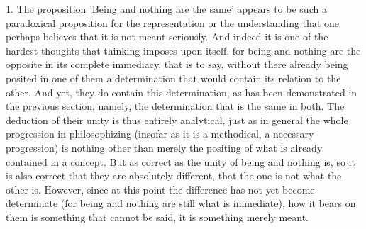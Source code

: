     1. The proposition 'Being and nothing are the same'
    appears to be such a paradoxical proposition
    for the representation or the understanding
    that one perhaps believes that it is not meant seriously.
    And indeed it is one of the hardest thoughts that
    thinking imposes upon itself,
    for being and nothing are the opposite
    in its complete immediacy, that is to say,
    without there already being posited in one of them
    a determination that would contain its relation to the other.
    And yet, they do contain this determination,
    as has been demonstrated in the previous section, namely,
    the determination that is the same in both.
    The deduction of their unity is thus entirely analytical,
    just as in general the whole progression in philosophizing
    (insofar as it is a methodical, a necessary progression)
    is nothing other than merely the positing of
    what is already contained in a concept.
    But as correct as the unity of being and nothing is,
    so it is also correct that they are absolutely different,
    that the one is not what the other is.
    However, since at this point the difference
    has not yet become determinate
    (for being and nothing are still what is immediate),
    how it bears on them is something that cannot be said,
    it is something merely meant.

